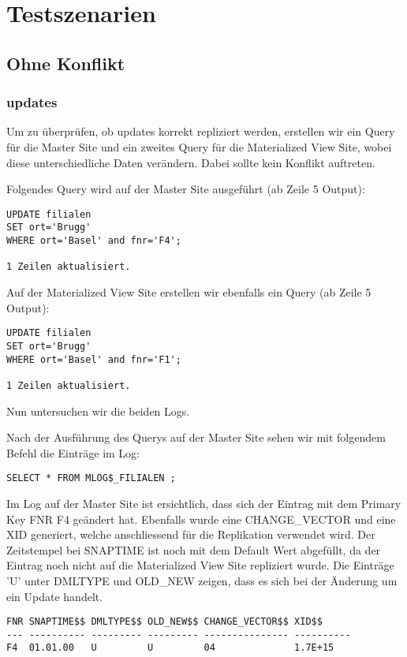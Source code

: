 \documentclass[11pt,a4paper,parskip=half]{scrartcl}
\begin{document}
\section{Testszenarien}
\subsection{Ohne Konflikt}
\subsubsection{updates}
Um zu überprüfen, ob updates korrekt repliziert werden, erstellen wir ein Query für die Master Site und ein zweites Query für die Materialized View Site, wobei diese unterschiedliche Daten verändern. Dabei sollte kein Konflikt auftreten.

Folgendes Query wird auf der Master Site ausgeführt (ab Zeile 5 Output):
\begin{lstlisting}
UPDATE filialen
SET ort='Brugg'
WHERE ort='Basel' and fnr='F4'; 

1 Zeilen aktualisiert.
\end{lstlisting}

Auf der Materialized View Site erstellen wir ebenfalls ein Query (ab Zeile 5 Output):
\begin{lstlisting}
UPDATE filialen
SET ort='Brugg'
WHERE ort='Basel' and fnr='F1'; 

1 Zeilen aktualisiert.
\end{lstlisting}

Nun untersuchen wir die beiden Logs.

Nach der Ausführung des Querys auf der Master Site sehen wir mit folgendem Befehl die Einträge im Log:
\begin{lstlisting}
SELECT * FROM MLOG$_FILIALEN ;
\end{lstlisting}

Im Log auf der Master Site ist ersichtlich, dass sich der Eintrag mit dem Primary Key FNR F4 geändert hat. Ebenfalls wurde eine CHANGE\_VECTOR und eine XID generiert, welche anschliessend für die Replikation verwendet wird.  Der Zeitstempel bei SNAPTIME ist noch mit dem Default Wert abgefüllt, da der Eintrag noch nicht auf die Materialized View Site repliziert wurde. Die Einträge 'U' unter DMLTYPE und OLD\_NEW zeigen, dass es sich bei der Änderung um ein Update handelt.
\begin{lstlisting}
FNR SNAPTIME$$ DMLTYPE$$ OLD_NEW$$ CHANGE_VECTOR$$ XID$$
--- ---------- --------- --------- --------------- ----------
F4  01.01.00   U         U         04              1.7E+15 
\end{lstlisting}
\end{document}
